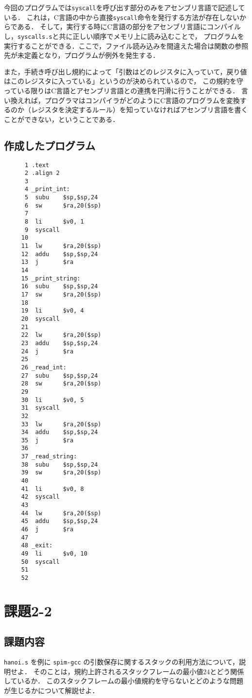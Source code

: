 \documentclass[a4j,11pt]{jarticle}
\begin{document}
今回のプログラムでは{\tt syscall}を呼び出す部分のみをアセンブリ言語で記述している．
これは，C言語の中から直接{\tt syscall}命令を発行する方法が存在しないからである．
そして，実行する時にC言語の部分をアセンブリ言語にコンパイルし，{\tt syscalls.s}と共に正しい順序でメモリ上に読み込むことで，
プログラムを実行することができる．ここで，ファイル読み込みを間違えた場合は関数の参照先が未定義となり，プログラムが例外を発生する．

また，手続き呼び出し規約によって「引数はどのレジスタに入っていて，戻り値はこのレジスタに入っている」というのが決められているので，
この規約を守っている限りはC言語とアセンブリ言語との連携を円滑に行うことができる．
言い換えれば，プログラマはコンパイラがどのようにC言語のプログラムを変換するのか（レジスタを決定するルール）を知っていなければアセンブリ言語を書くことができない，ということである．

\subsection{作成したプログラム}
\begin{verbatim}
      1	.text
      2	.align 2
      3	
      4	_print_int:
      5	 subu    $sp,$sp,24
      6	 sw      $ra,20($sp)
      7	
      8	 li      $v0, 1
      9	 syscall
     10	
     11	 lw      $ra,20($sp)
     12	 addu    $sp,$sp,24
     13	 j       $ra 
     14	
     15	_print_string:
     16	 subu    $sp,$sp,24
     17	 sw      $ra,20($sp)
     18	
     19	 li      $v0, 4
     20	 syscall
     21	
     22	 lw      $ra,20($sp)
     23	 addu    $sp,$sp,24
     24	 j       $ra 
     25	
     26	_read_int:
     27	 subu    $sp,$sp,24
     28	 sw      $ra,20($sp)
     29	
     30	 li      $v0, 5
     31	 syscall
     32	
     33	 lw      $ra,20($sp)
     34	 addu    $sp,$sp,24
     35	 j       $ra 
     36	
     37	_read_string:
     38	 subu    $sp,$sp,24
     39	 sw      $ra,20($sp)
     40	
     41	 li      $v0, 8
     42	 syscall
     43	
     44	 lw      $ra,20($sp)
     45	 addu    $sp,$sp,24
     46	 j       $ra
     47	
     48	_exit:
     49	 li      $v0, 10
     50	 syscall
     51	
     52	 	
\end{verbatim}

\section{課題2-2}
\subsection{課題内容}
{\tt hanoi.s} を例に {\tt spim-gcc} の引数保存に関するスタックの利用方法について，説明せよ． 
そのことは，規約上許されるスタックフレームの最小値$24$とどう関係しているか． 
このスタックフレームの最小値規約を守らないとどのような問題が生じるかについて解説せよ．
\end{document}
